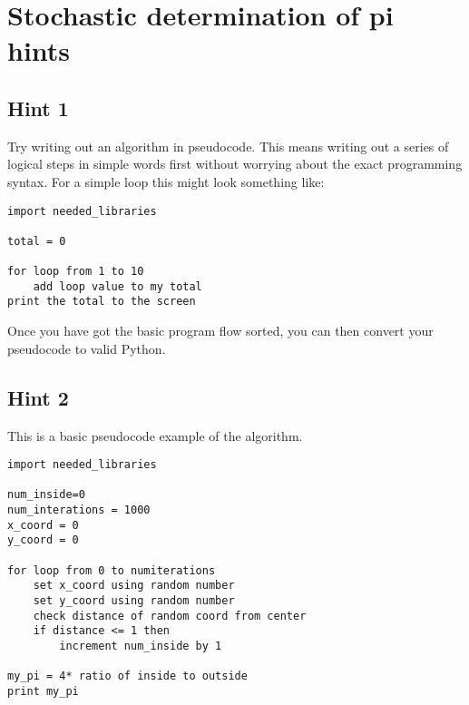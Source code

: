 \appendix
\section{Stochastic determination of pi hints}\label{app:pi_hints}
	\subsection{Hint 1}
		Try writing out an algorithm in pseudocode. This means writing out a series of logical steps in simple words first without worrying about the exact programming syntax. For a simple loop this might look something like:

		\begin{lstlisting}
import needed_libraries

total = 0

for loop from 1 to 10
	add loop value to my total
print the total to the screen\end{lstlisting}

		Once you have got the basic program flow sorted, you can then convert your pseudocode to valid Python.

	\subsection{Hint 2}
		This is a basic pseudocode example of the algorithm.

		\begin{lstlisting}
import needed_libraries

num_inside=0
num_interations = 1000
x_coord = 0
y_coord = 0

for loop from 0 to numiterations
	set x_coord using random number
	set y_coord using random number
	check distance of random coord from center
	if distance <= 1 then
		increment num_inside by 1

my_pi = 4* ratio of inside to outside
print my_pi\end{lstlisting}